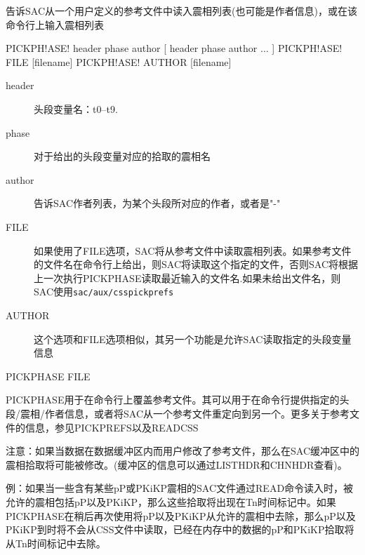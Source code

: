 \label{cmd:pickphase}

告诉SAC从一个用户定义的参考文件中读入震相列表(也可能是作者信息)，或在该命令行上输入震相列表

\begin{SACSTX}
PICKPH!ASE! header phase author [ header phase author ... ]
PICKPH!ASE! FILE [filename]
PICKPH!ASE! AUTHOR [filename]
\end{SACSTX}

\begin{description}
\item [header] 头段变量名：t0--t9.
\item [phase] 对于给出的头段变量对应的拾取的震相名
\item [author] 告诉SAC作者列表，为某个头段所对应的作者，或者是"-"
\item [FILE] 如果使用了FILE选项，SAC将从参考文件中读取震相列表。如果参考文件的文件名在命令行上给出，则SAC将读取这个指定的文件，否则SAC将根据上一次执行PICKPHASE读取最近输入的文件名.如果未给出文件名，则SAC使用\texttt{sac/aux/csspickprefs}
\item [AUTHOR] 这个选项和FILE选项相似，其另一个功能是允许SAC读取指定的头段变量信息
\end{description}

PICKPHASE FILE

PICKPHASE用于在命令行上覆盖参考文件。其可以用于在命令行提供指定的头段/震相/作者信息，或者将SAC从一个参考文件重定向到另一个。更多关于参考文件的信息，参见PICKPREFS以及READCSS

注意：如果当数据在数据缓冲区内而用户修改了参考文件，那么在SAC缓冲区中的震相拾取将可能被修改。(缓冲区的信息可以通过LISTHDR和CHNHDR查看)。

例：如果当一些含有某些pP或PKiKP震相的SAC文件通过READ命令读入时，被允许的震相包括pP以及PKiKP，那么这些拾取将出现在Tn时间标记中。如果PICKPHASE在稍后再次使用将pP以及PKiKP从允许的震相中去除，那么pP以及PKiKP到时将不会从CSS文件中读取，已经在内存中的数据的pP和PKiKP拾取将从Tn时间标记中去除。
